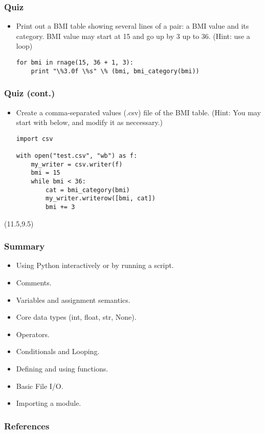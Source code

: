 \documentclass{beamer}
\begin{document}
\begin{frame}[fragile]
\frametitle{Quiz}
\begin{itemize}
\item Print out a BMI table showing several lines of
    a pair: a BMI value and its category. BMI value
    may start at 15 and go up by 3 up to 36.
    (Hint: use a loop)
\begin{lstlisting}
for bmi in rnage(15, 36 + 1, 3):
    print "\%3.0f \%s" \% (bmi, bmi_category(bmi))
\end{lstlisting}
\end{itemize}
\end{frame}

\begin{frame}[fragile]
\frametitle{Quiz (cont.)}
\begin{itemize}
\item Create a comma-separated values (.csv) file
    of the BMI table. (Hint: You may start with below,
    and modify it as neccessary.) 
\begin{lstlisting}
import csv

with open("test.csv", "wb") as f:
    my_writer = csv.writer(f)
    bmi = 15
    while bmi < 36:
        cat = bmi_category(bmi)
        my_writer.writerow([bmi, cat])
        bmi += 3
\end{lstlisting}
\end{itemize}

\begin{textblock}{5}(11.5,9.5)
\end{textblock}

\end{frame}

\begin{frame}[fragile]
\frametitle{Summary}
\begin{itemize}
\item Using Python interactively or by running a script.
\item Comments.
\item Variables and assignment semantics.
\item Core data types (int, float, str, None).
\item Operators.
\item Conditionals and Looping.
\item Defining and using functions.
\item Basic File I/O.
\item Importing a module.
\end{itemize}
\end{frame}

\begin{frame}%
  \frametitle{References}
  
  \scriptsize
  
\end{frame}
\end{document}

